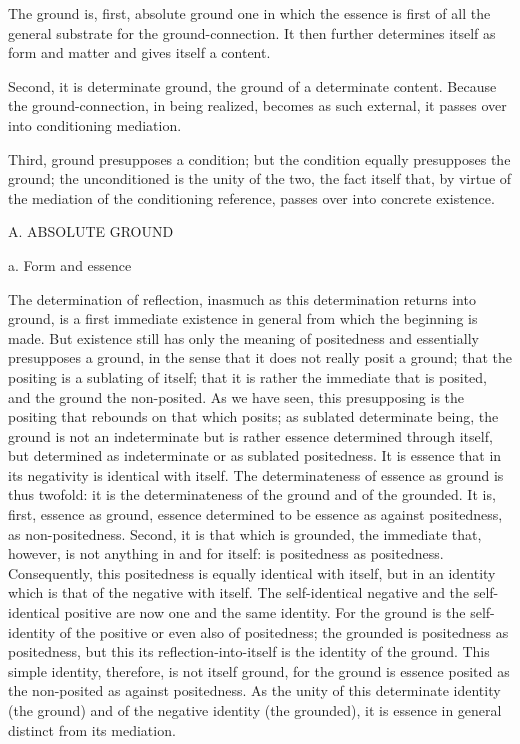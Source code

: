 The ground is, first, absolute ground
one in which the essence is first of all
the general substrate for the ground-connection.
It then further determines itself as form and matter
and gives itself a content.

Second, it is determinate ground,
the ground of a determinate content.
Because the ground-connection, in being realized,
becomes as such external,
it passes over into conditioning mediation.

Third, ground presupposes a condition;
but the condition equally presupposes the ground;
the unconditioned is the unity of the two,
the fact itself that, by virtue of
the mediation of the conditioning reference,
passes over into concrete existence.

A. ABSOLUTE GROUND

a. Form and essence

The determination of reflection,
inasmuch as this determination returns into ground,
is a first immediate existence in general
from which the beginning is made.
But existence still has only the meaning of positedness
and essentially presupposes a ground,
in the sense that it does not really posit a ground;
that the positing is a sublating of itself;
that it is rather the immediate that is posited,
and the ground the non-posited.
As we have seen, this presupposing is the positing
that rebounds on that which posits;
as sublated determinate being, the ground is not an indeterminate
but is rather essence determined through itself,
but determined as indeterminate or as sublated positedness.
It is essence that in its negativity is identical with itself.
The determinateness of essence as ground is thus twofold:
it is the determinateness of the ground and of the grounded.
It is, first, essence as ground,
essence determined to be essence
as against positedness, as non-positedness.
Second, it is that which is grounded,
the immediate that, however, is not anything in and for itself:
is positedness as positedness.
Consequently, this positedness is equally identical with itself,
but in an identity which is that of the negative with itself.
The self-identical negative and the self-identical positive
are now one and the same identity.
For the ground is the self-identity
of the positive or even also of positedness;
the grounded is positedness as positedness,
but this its reflection-into-itself is the identity of the ground.
This simple identity, therefore, is not itself ground,
for the ground is essence posited as
the non-posited as against positedness.
As the unity of this determinate identity (the ground)
and of the negative identity (the grounded),
it is essence in general distinct from its mediation.

